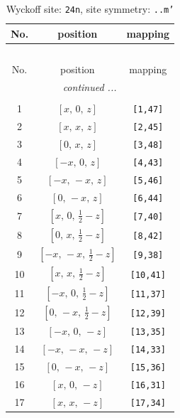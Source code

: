 \documentclass[fleqn,8pt]{jsarticle}
\begin{document}
\begin{longtable}{ccc}
\caption{Wyckoff site: {\tt 24n}, site symmetry: {\tt ..m'}}
 \\
 \hline \hline
No. & position & mapping \\ \hline \endfirsthead

\multicolumn{2}{l}{\tablename\ \thetable{}} \\
 \hline \hline
No. & position & mapping \\ \hline \endhead

 \hline \hline
\multicolumn{2}{r}{\footnotesize\it continued ...} \\ \endfoot

 \hline \hline
\multicolumn{2}{r}{} \\ \endlastfoot

1 & $\left[ x,\, 0,\, z \right]$ & {\tt [1,47]} \\ \hline
2 & $\left[ x,\, x,\, z \right]$ & {\tt [2,45]} \\ \hline
3 & $\left[ 0,\, x,\, z \right]$ & {\tt [3,48]} \\ \hline
4 & $\left[ - x,\, 0,\, z \right]$ & {\tt [4,43]} \\ \hline
5 & $\left[ - x,\, - x,\, z \right]$ & {\tt [5,46]} \\ \hline
6 & $\left[ 0,\, - x,\, z \right]$ & {\tt [6,44]} \\ \hline
7 & $\left[ x,\, 0,\, \frac{1}{2} - z \right]$ & {\tt [7,40]} \\ \hline
8 & $\left[ 0,\, x,\, \frac{1}{2} - z \right]$ & {\tt [8,42]} \\ \hline
9 & $\left[ - x,\, - x,\, \frac{1}{2} - z \right]$ & {\tt [9,38]} \\ \hline
10 & $\left[ x,\, x,\, \frac{1}{2} - z \right]$ & {\tt [10,41]} \\ \hline
11 & $\left[ - x,\, 0,\, \frac{1}{2} - z \right]$ & {\tt [11,37]} \\ \hline
12 & $\left[ 0,\, - x,\, \frac{1}{2} - z \right]$ & {\tt [12,39]} \\ \hline
13 & $\left[ - x,\, 0,\, - z \right]$ & {\tt [13,35]} \\ \hline
14 & $\left[ - x,\, - x,\, - z \right]$ & {\tt [14,33]} \\ \hline
15 & $\left[ 0,\, - x,\, - z \right]$ & {\tt [15,36]} \\ \hline
16 & $\left[ x,\, 0,\, - z \right]$ & {\tt [16,31]} \\ \hline
17 & $\left[ x,\, x,\, - z \right]$ & {\tt [17,34]} \\ \hline

\end{longtable}
\end{document}
